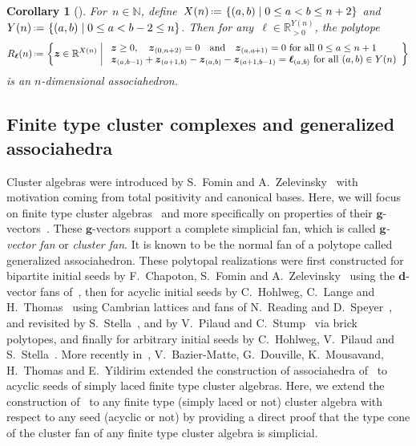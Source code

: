 \documentclass{amsart}
\newtheorem{corollary}[theorem]{Corollary}
\theoremstyle{definition}
\newcommand{\R}{\mathbb{R}} %
\newcommand{\N}{\mathbb{N}} %
\renewcommand{\b}[1]{{\boldsymbol{#1}}} %
\newcommand{\set}[2]{\left\{ #1 \;\middle|\; #2 \right\}} %
\newcommand{\bigset}[2]{\big\{ #1 \;\big|\; #2 \big\}} %
\newcommand{\eqdef}{\mbox{\,\raisebox{0.2ex}{\scriptsize\ensuremath{\mathrm:}}\ensuremath{=}\,}} %
\newcommand{\darkblue}{\color{darkblue}} %
\newcommand{\defn}[1]{\textsl{\darkblue #1}} %
\begin{document}
\begin{corollary}[{\cite[Sect.~3.2]{ArkaniHamedBaiHeYan}}]
For~$n \in \N$, define~$X(n) \eqdef \set{(a,b)}{0 \le a < b \le n+2}$ and~$Y(n) \eqdef \set{(a,b)}{0 \le a < b-2 \le n}$.
Then for any~$\b{\ell} \in \R_{>0}^{Y(n)}$, the polytope
\[
R_\b{\ell}(n) \eqdef \set{\b{z} \in \R^{X(n)}}{\begin{array}{l} \b{z} \ge 0, \quad \b{z}_{(0,n+2)} = 0 \quad\text{and}\quad \b{z}_{(a,a+1)} = 0 \text{ for all } 0 \le a \le n+1 \\ \b{z}_{(a,b-1)} + \b{z}_{(a+1,b)} - \b{z}_{(a,b)} - \b{z}_{(a+1,b-1)} = \b{\ell}_{(a,b)} \text{ for all } (a,b) \in Y(n) \end{array}}
\]
is an $n$-dimensional associahedron.
\end{corollary}


\subsection{Finite type cluster complexes and generalized associahedra}

Cluster algebras were introduced by S.~Fomin and A.~Zelevinsky~\cite{FominZelevinsky-ClusterAlgebrasI} with motivation coming from total positivity and canonical bases.
Here, we will focus on finite type cluster algebras~\cite{FominZelevinsky-ClusterAlgebrasII} and more specifically on properties of their $\b{g}$-vectors~\cite{FominZelevinsky-ClusterAlgebrasIV}.
These $\b{g}$-vectors support a complete simplicial fan, which is called \defn{$\b{g}$-vector fan} or \defn{cluster fan}. It is known to be the normal fan of a polytope called generalized associahedron. These polytopal realizations were first constructed for bipartite initial seeds by F.~Chapoton, S.~Fomin and A.~Zelevinsky~\cite{ChapotonFominZelevinsky} using the $\b{d}$-vector fans of~\cite{FominZelevinsky-YSystems}, then for acyclic initial seeds by C.~Hohlweg, C.~Lange and H.~Thomas~\cite{HohlwegLangeThomas} using Cambrian lattices and fans of N.~Reading and D.~Speyer~\cite{Reading-CambrianLattices, ReadingSpeyer}, and revisited by S.~Stella~\cite{Stella}, and by V.~Pilaud and C.~Stump~\cite{PilaudStump-brickPolytope} via brick polytopes, and finally for arbitrary initial seeds by C.~Hohlweg, V.~Pilaud and S.~Stella~\cite{HohlwegPilaudStella}.
More recently in~\cite{BazierMatteDouvilleMousavandThomasYildirim}, V.~Bazier-Matte, G.~Douville, K.~Mousavand, H.~Thomas and E.~Yildirim extended the construction of associahedra of~\cite[Sect.~3.2]{ArkaniHamedBaiHeYan} to acyclic seeds of simply laced finite type cluster algebras.
Here, we extend the construction of~\cite[Sect.~3.2]{ArkaniHamedBaiHeYan} to any finite type (simply laced or not) cluster algebra with respect to any seed (acyclic or not) by providing a direct proof that the type cone of the cluster fan of any finite type cluster algebra is simplicial.
\end{document}
